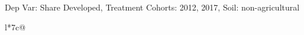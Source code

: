 \begin{table}[H]
\captionlistentry[table]{}
\label{table:beaver_land_class_DVis_land_class_3_SCg12_SSNAG}
\scriptsize %
Dep Var: Share Developed, Treatment Cohorts: 2012, 2017, Soil: non-agricultural \\
\begin{threeparttable}
\begin{tabulary}{\textwidth}{l*{7}{c}@{}}
\toprule \toprule
\noalign{\smallskip}
\noalign{\smallskip}
\midrule \bottomrule
\end{tabulary}
\medskip
\end{threeparttable}
\end{table}
